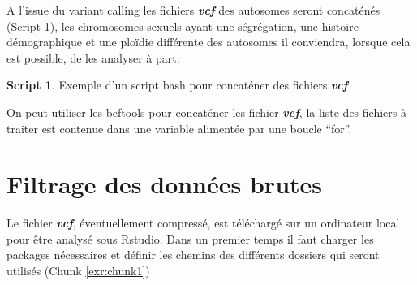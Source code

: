 \documentclass[
  openany]{book}
\newenvironment{Shaded}{\begin{snugshade}}{\end{snugshade}}
\newcommand{\AttributeTok}[1]{\textcolor[rgb]{0.13,0.29,0.53}{#1}}
\newcommand{\CommentTok}[1]{\textcolor[rgb]{0.56,0.35,0.01}{\textit{#1}}}
\newcommand{\ControlFlowTok}[1]{\textcolor[rgb]{0.13,0.29,0.53}{\textbf{#1}}}
\newcommand{\DecValTok}[1]{\textcolor[rgb]{0.00,0.00,0.81}{#1}}
\newcommand{\ExtensionTok}[1]{#1}
\newcommand{\KeywordTok}[1]{\textcolor[rgb]{0.13,0.29,0.53}{\textbf{#1}}}
\newcommand{\NormalTok}[1]{#1}
\newcommand{\OperatorTok}[1]{\textcolor[rgb]{0.81,0.36,0.00}{\textbf{#1}}}
\newcommand{\StringTok}[1]{\textcolor[rgb]{0.31,0.60,0.02}{#1}}
\newcommand{\VariableTok}[1]{\textcolor[rgb]{0.00,0.00,0.00}{#1}}
\theoremstyle{definition}
\theoremstyle{definition}
\newtheorem{example}{Script}[chapter]
\theoremstyle{definition}
\theoremstyle{definition}
\theoremstyle{remark}
\begin{document}
A l'issue du variant calling les fichiers \textbf{\emph{vcf}} des autosomes seront concaténés (Script \ref{exm:script2}), les chromosomes sexuels ayant une ségrégation, une histoire démographique et une ploïdie différente des autosomes il conviendra, lorsque cela est possible, de les analyser à part.

\begin{example}
\protect\hypertarget{exm:script2}{}\label{exm:script2}{Exemple d'un script bash pour concaténer des fichiers \textbf{\emph{vcf}}}
\end{example}

On peut utiliser les bcftools pour concaténer les fichier \textbf{\emph{vcf}}, la liste des fichiers à traiter est contenue dans une variable alimentée par une boucle ``for''.

\begin{Shaded}
\end{Shaded}

\hypertarget{filtrage-des-donnuxe9es-brutes}{%
\section*{Filtrage des données brutes}\label{filtrage-des-donnuxe9es-brutes}}

Le fichier \textbf{\emph{vcf}}, éventuellement compressé, est téléchargé sur un ordinateur local pour être analysé sous Rstudio.
Dans un premier temps il faut charger les packages nécessaires et définir les chemins des différents dossiers qui seront utilisés (Chunk \ref{exr:chunk1})
\end{document}
